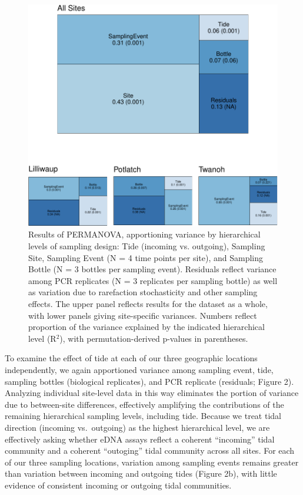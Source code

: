 \documentclass[fleqn,10pt,lineno]{wlpeerj} %
\begin{document}
\begin{figure}[!ht]

{\centering \includegraphics{figures/FIG2_ADONIS_TreemapDiagrams-1} 

}

\caption{\label{fig:AdonisFigure}Results of PERMANOVA, apportioning variance by hierarchical levels of sampling design: Tide (incoming vs. outgoing), Sampling Site, Sampling Event (N = 4 time points per site), and Sampling Bottle (N = 3 bottles per sampling event). Residuals reflect variance among PCR replicates (N = 3 replicates per sampling bottle) as well as variation due to rarefaction stochasticity and other sampling effects. The upper panel reflects results for the dataset as a whole, with lower panels giving site-specific variances. Numbers reflect proportion of the variance explained by the indicated hierarchical level (R$^2$), with permutation-derived p-values in parentheses.}\label{fig:FIG2_ADONIS_TreemapDiagrams}
\end{figure}

To examine the effect of tide at each of our three geographic locations
independently, we again apportioned variance among sampling event, tide,
sampling bottles (biological replicates), and PCR replicate (residuals;
Figure 2). Analyzing individual site-level data in this way eliminates
the portion of variance due to between-site differences, effectively
amplifying the contributions of the remaining hierarchical sampling
levels, including tide. Because we treat tidal direction (incoming
vs.~outgoing) as the highest hierarchical level, we are effectively
asking whether eDNA assays reflect a coherent ``incoming'' tidal
community and a coherent ``outoging'' tidal community across all sites.
For each of our three sampling locations, variation among sampling
events remains greater than variation between incoming and outgoing
tides (Figure 2b), with little evidence of consistent incoming or
outgoing tidal communities.
\end{document}
